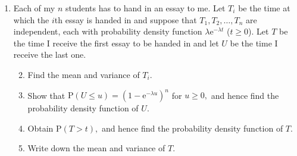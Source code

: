 \documentclass[a4, 11pt]{report}
\newlength{\qspace}
\newcounter{qnumber}
\newenvironment{question}%
 {\vspace{\qspace}
  \begin{enumerate}[\bfseries 1\quad][10]%
    \setcounter{enumi}{\value{qnumber}}%
    \item%
 }
{
  \end{enumerate}
  \filbreak
  \stepcounter{qnumber}
 }
\newenvironment{questionparts}[1][1]%
 {
  \begin{enumerate}[\bfseries (i)]%
    \setcounter{enumii}{#1}
    \addtocounter{enumii}{-1}
    \setlength{\itemsep}{5mm}
    \setlength{\parskip}{8pt}
 }
 {
  \end{enumerate}
 }
\begin{document}
\begin{question}
Each of my $n$ students has to hand in an essay to me. Let $T_{i}$
be the time at which the $i$th essay is handed in and suppose that
$T_{1},T_{2},\ldots,T_{n}$ are independent, each with probability
density function $\lambda\mathrm{e}^{-\lambda t}$ ($t\geqslant0$).
Let $T$ be the time I receive the first essay to be handed in and
let $U$ be the time I receive the last one. 
\begin{questionparts}
\item Find the mean and variance of $T_{i}.$
\item Show that $\mathrm{P}(U\leqslant u)=(1-\mathrm{e}^{-\lambda u})^{n}$
for $u\geqslant0,$ and hence find the probability density function
of $U$. 
\item Obtain $\mathrm{P}(T>t),$ and hence find the probability density
function of $T$. 
\item Write down the mean and variance of $T$. 
\end{questionparts}
\end{question}
\end{document}
